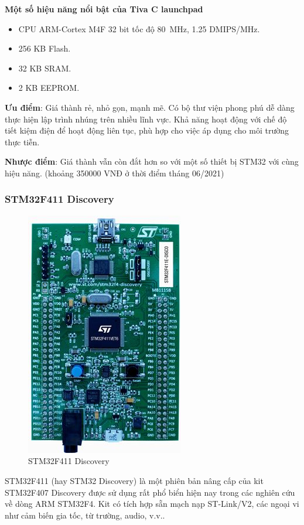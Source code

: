 \textbf{Một số hiệu năng nổi bật của Tiva C launchpad}
\begin{itemize}
    \item CPU ARM-Cortex M4F 32 bit tốc độ \si{80\MHz}, 1.25 DMIPS/MHz.
    \item 256 KB Flash.
    \item 32 KB SRAM.
    \item 2 KB EEPROM.
\end{itemize}

\textbf{Ưu điểm}: Giá thành rẻ, nhỏ gọn, mạnh mẽ. Có bộ thư viện phong phú dễ dàng thực hiện lập trình nhúng trên nhiều lĩnh vực.
Khả năng hoạt động với chế độ tiết kiệm điện để hoạt động liên tục, phù hợp cho việc áp dụng cho môi trường thực tiễn.

\textbf{Nhược điểm}: Giá thành vẫn còn đắt hơn so với một số thiết bị STM32 với cùng hiệu năng. (khoảng 350000 VNĐ ở thời điểm tháng 06/2021)

\clearpage
\subsubsection{STM32F411 Discovery}
\begin{figure}[ht]
\centering
\includegraphics[scale=0.5]{images/en-stm32f411e-disco.jpg}
\caption{STM32F411 Discovery}
\end{figure}

STM32F411 \cite{discovery_datasheet} (hay STM32 Discovery) là một phiên bản nâng cấp của kit STM32F407 Discovery được sử dụng rất phổ biển hiện nay trong các nghiên cứu về dòng ARM STM32F4.
Kit có tích hợp sẵn mạch nạp ST-Link/V2, các ngoại vi như cảm biến gia tốc, từ trường, audio, v.v..

